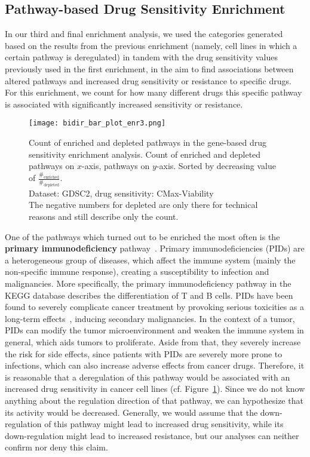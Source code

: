 \subsection{Pathway-based Drug Sensitivity Enrichment}\label{subsec:bidir_enr3}
In our third and final enrichment analysis, we used the categories generated based on the results from the previous enrichment (namely, cell lines in which a certain pathway is deregulated) in tandem with the drug sensitivity values previously used in the first enrichment, in the aim to find associations between altered pathways and increased drug sensitivity or resistance to specific drugs.\\
For this enrichment, we count for how many different drugs this specific pathway is associated with significantly increased sensitivity or resistance.\\
\begin{figure}
    \centering
    \texttt{[image: bidir\_bar\_plot\_enr3.png]}
    \caption{Count of enriched and depleted pathways in the gene-based drug sensitivity enrichment analysis. Count of enriched and depleted pathways on $x$-axis, pathways on $y$-axis. Sorted by decreasing value of $\frac{\#_{\text{enriched}}}{\#_{\text{depleted}}}$.\\Dataset: GDSC2, drug sensitivity: CMax-Viability\\The negative numbers for depleted are only there for technical reasons and still describe only the count.}
    \label{fig:bidir_enr3}
\end{figure}
One of the pathways which turned out to be enriched the most often is the \textbf{primary immunodeficiency} pathway~\cite{kegg_pid}. Primary immunodeficiencies (PIDs) are a heterogeneous group of diseases, which affect the immune system (mainly the non-specific immune response), creating a susceptibility to infection and malignancies. More specifically, the primary immunodeficiency pathway in the KEGG database describes the differentiation of T and B cells. PIDs have been found to severely complicate cancer treatment by provoking serious toxicities as a long-term effects~\cite{pids, pid_cancer}, inducing secondary malignancies. In the context of a tumor, PIDs can modify the tumor microenvironment and weaken the immune system in general, which aids tumors to proliferate. Aside from that, they severely increase the risk for side effects, since patients with PIDs are severely more prone to infections, which can also increase adverse effects from cancer drugs.
Therefore, it is reasonable that a deregulation of this pathway would be associated with an increased drug sensitivity in cancer cell lines (cf. Figure~\ref{fig:bidir_enr3}). Since we do not know anything about the regulation direction of that pathway, we can hypothesize that its activity would be decreased. Generally, we would assume that the down-regulation of this pathway might lead to increased drug sensitivity, while its down-regulation might lead to increased resistance, but our analyses can neither confirm nor deny this claim.\\

